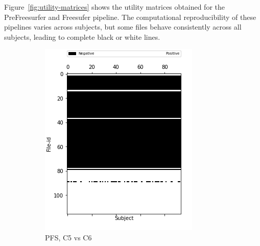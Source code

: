 \documentclass[10pt, conference, compsocconf]{IEEEtran}
\begin{document}
Figure~\ref{fig:utility-matrices} shows the utility matrices
obtained for the PreFreesurfer and Freesufer pipeline. The computational
reproducibility of these pipelines varies across subjects,
but some files behave
consistently across all subjects, leading to complete black or white
lines.

\begin{figure}[h!]
  \centering
  \begin{subfigure}[b]{0.45\linewidth}
        \includegraphics[width=\columnwidth]{data/Utility_Matrix/PreFreeSurfer/PFS_5v6_utility_matrix.png}
  \caption{PFS, C5 vs C6}
  \end{subfigure}
  \begin{subfigure}[b]{0.45\linewidth}

\end{subfigure}
\end{figure}
\end{document}
